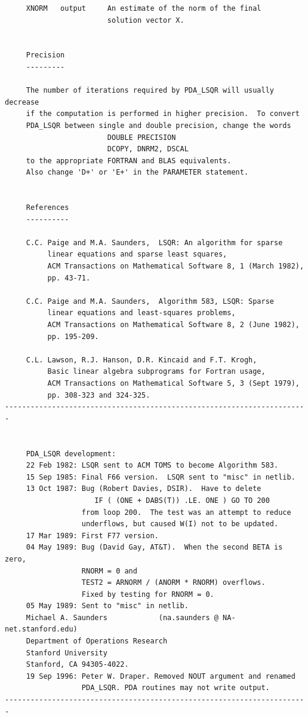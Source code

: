 \documentclass[11pt,twoside]{article}
\begin{document}
\begin{verbatim}
     XNORM   output     An estimate of the norm of the final
                        solution vector X.


     Precision
     ---------

     The number of iterations required by PDA_LSQR will usually decrease
     if the computation is performed in higher precision.  To convert
     PDA_LSQR between single and double precision, change the words
                        DOUBLE PRECISION
                        DCOPY, DNRM2, DSCAL
     to the appropriate FORTRAN and BLAS equivalents.
     Also change 'D+' or 'E+' in the PARAMETER statement.


     References
     ----------

     C.C. Paige and M.A. Saunders,  LSQR: An algorithm for sparse
          linear equations and sparse least squares,
          ACM Transactions on Mathematical Software 8, 1 (March 1982),
          pp. 43-71.

     C.C. Paige and M.A. Saunders,  Algorithm 583, LSQR: Sparse
          linear equations and least-squares problems,
          ACM Transactions on Mathematical Software 8, 2 (June 1982),
          pp. 195-209.

     C.L. Lawson, R.J. Hanson, D.R. Kincaid and F.T. Krogh,
          Basic linear algebra subprograms for Fortran usage,
          ACM Transactions on Mathematical Software 5, 3 (Sept 1979),
          pp. 308-323 and 324-325.
-----------------------------------------------------------------------


     PDA_LSQR development:
     22 Feb 1982: LSQR sent to ACM TOMS to become Algorithm 583.
     15 Sep 1985: Final F66 version.  LSQR sent to "misc" in netlib.
     13 Oct 1987: Bug (Robert Davies, DSIR).  Have to delete
                     IF ( (ONE + DABS(T)) .LE. ONE ) GO TO 200
                  from loop 200.  The test was an attempt to reduce
                  underflows, but caused W(I) not to be updated.
     17 Mar 1989: First F77 version.
     04 May 1989: Bug (David Gay, AT&T).  When the second BETA is zero,
                  RNORM = 0 and
                  TEST2 = ARNORM / (ANORM * RNORM) overflows.
                  Fixed by testing for RNORM = 0.
     05 May 1989: Sent to "misc" in netlib.
     Michael A. Saunders            (na.saunders @ NA-net.stanford.edu)
     Department of Operations Research
     Stanford University
     Stanford, CA 94305-4022.
     19 Sep 1996: Peter W. Draper. Removed NOUT argument and renamed
                  PDA_LSQR. PDA routines may not write output.
-----------------------------------------------------------------------
\end{verbatim}
\end{document}
